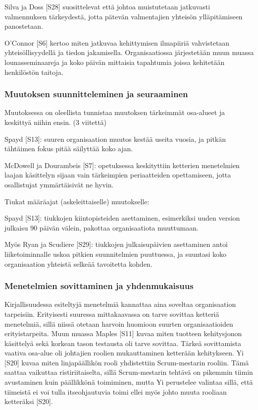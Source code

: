 Silva ja Doss [S28] suosittelevat että johtoa muistutetaan jatkuvasti
valmennuksen tärkeydestä, jotta pätevän valmentajien yhteisön ylläpitämiseen
panostetaan.

O'Connor [S6] kertoo miten jatkuvaa kehittymisen ilmapiiriä vahvistetaan
yhteisöllisyydellä ja tiedon jakamisella. Organisaatiossa järjestetään muun
muassa lounasseminaareja ja koko päivän mittaisia tapahtumia joissa kehitetään
henkilöstön taitoja.

\subsubsection{Muutoksen suunnitteleminen ja seuraaminen}

Muutoksessa on oleellista tunnistaa muutoksen tärkeimmät osa-alueet ja keskittyä
niihin ensin. (3 viitettä)

Spayd [S13]: suuren organisaation muutos kestää useita vuosia, ja pitkän
tähtäimen fokus pitää säilyttää koko ajan.

McDowell ja Dourambeis [S7]: opetuksessa keskityttiin ketterien menetelmien
laajan käsittelyn sijaan vain tärkeimpien periaatteiden opettamiseen, jotta
osallistujat ymmärtäisivät ne hyvin.

Tiukat määräajat (askeleittaiselle) muutokselle:

Spayd [S13]: tiukkojen kiintopisteiden asettaminen, esimerkiksi uuden version
julkaisu 90 päivän välein, pakottaa organisaatiota muuttumaan.

Myös Ryan ja Scudiere [S29]: tiukkojen julkaisupäivien asettaminen antoi
liiketoiminnalle uskoa pitkien suunnitelmien puuttuessa, ja suuntasi koko
organisaation yhteistä selkeää tavoitetta kohden.

\subsubsection{Menetelmien sovittaminen ja yhdenmukaisuus}

Kirjallisuudessa esiteltyjä menetelmiä kannattaa aina soveltaa organisaation
tarpeisiin. Erityisesti suuressa mittakaavassa on tarve sovittaa ketteriä
menetelmiä, sillä niissä otetaan harvoin huomioon suurten organisaatioiden
erityistarpeita. Muun muassa Maples [S11] kuvaa miten tuotteen kehitysjonon
käsittelyä sekä korkean tason testausta oli tarve sovittaa. Tärkeä sovittamista
vaativa osa-alue oli johtajien roolien mukauttaminen ketterään kehitykseen.
Yi [S20] kuvaa miten linjapäällikön rooli yhdistettiin Scrum-mestarin rooliin.
Tämä saattaa vaikuttaa ristiriitaiselta, sillä Scrum-mestarin tehtävä on
pikemmin tiimin avustaminen kuin päällikkönä toimiminen, mutta Yi perustelee
valintaa sillä, että tiimeistä ei voi tulla itseohjautuvia toimi ellei myös
johto muuta rooliaan ketteräksi [S20]. 

